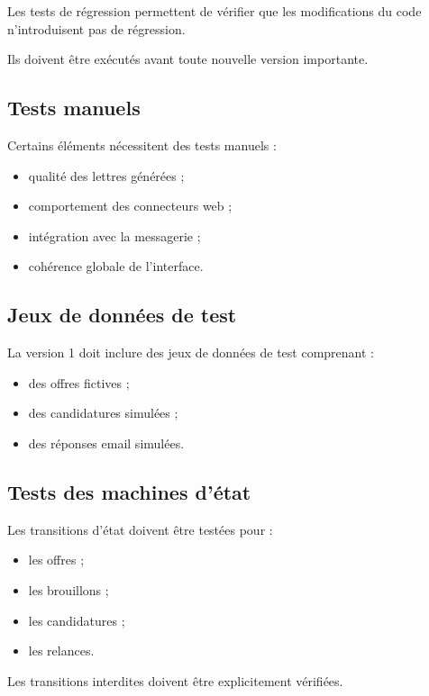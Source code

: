 \documentclass[11pt,a4paper]{article}
\begin{document}
Les tests de régression permettent de vérifier que les modifications du code n’introduisent pas de régression.

Ils doivent être exécutés avant toute nouvelle version importante.

\subsection{Tests manuels}

Certains éléments nécessitent des tests manuels :

\begin{itemize}
    \item qualité des lettres générées ;
    \item comportement des connecteurs web ;
    \item intégration avec la messagerie ;
    \item cohérence globale de l’interface.
\end{itemize}

\subsection{Jeux de données de test}

La version 1 doit inclure des jeux de données de test comprenant :

\begin{itemize}
    \item des offres fictives ;
    \item des candidatures simulées ;
    \item des réponses email simulées.
\end{itemize}

\subsection{Tests des machines d’état}

Les transitions d’état doivent être testées pour :

\begin{itemize}
    \item les offres ;
    \item les brouillons ;
    \item les candidatures ;
    \item les relances.
\end{itemize}

Les transitions interdites doivent être explicitement vérifiées.
\end{document}
